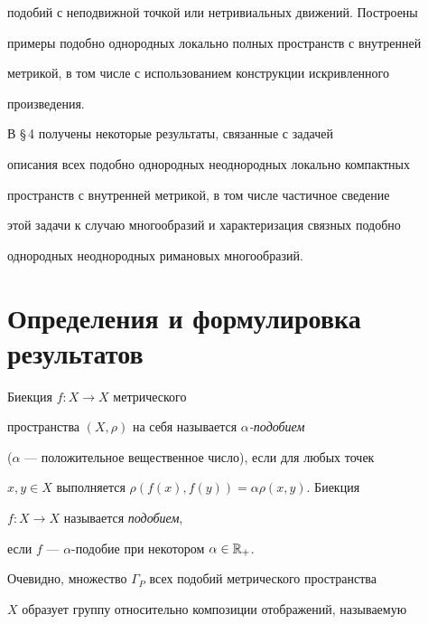 подобий с неподвижной точкой или нетривиальных движений. Построены 


примеры подобно однородных локально полных пространств с внутренней 


метрикой, в том числе с использованием конструкции искривленного 


произведения.





В \S\,4 получены некоторые результаты, связанные с задачей 


описания всех подобно однородных неоднородных локально компактных 


пространств с внутренней метрикой, в том числе частичное сведение 


этой задачи к случаю многообразий и характеризация связных подобно 


однородных неоднородных римановых многообразий.














\section{Определения и формулировка результатов}





\begin{defns}


Биекция $f: X \rightarrow X$  метрического


пространства $(X,\rho)$ на себя называется {\it $\alpha$-подобием}


($\alpha$ --- положительное вещественное число), если для любых точек


$x,y \in X$ выполняется $\rho (f(x),f(y))= \alpha \rho (x,y)$. Биекция


$f: X \rightarrow X$ называется {\it подобием},


если $f$ --- $\alpha$-по\-добие при некотором $\alpha \in \Bbb{R}_{+}$.


\end{defns}





Очевидно, множество $\Gamma_{P}$ всех подобий метрического пространства


$X$ образует группу относительно композиции отображений, называемую


